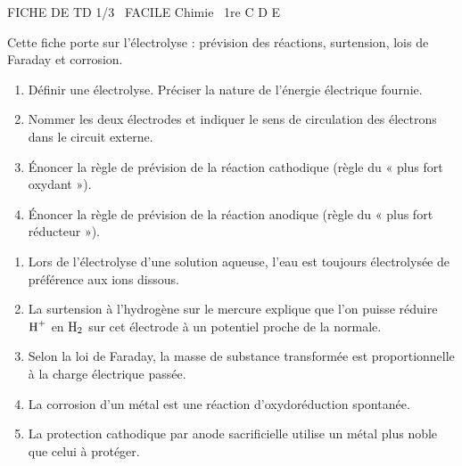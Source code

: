 \documentclass[11pt]{article}
\begin{document}
\begin{tcolorbox}[enhanced,colback=popink,colframe=popink,arc=10pt,boxrule=0pt,left=12pt,right=12pt,top=9pt,bottom=9pt]
{\color{white}\popxbold\small FICHE DE TD 1/3 \textbullet\ FACILE \hfill Chimie \textbullet\ 1re C D E\par}
\end{tcolorbox}
\vspace{4pt}
Cette fiche porte sur l'électrolyse : prévision des réactions, surtension, lois de Faraday et corrosion.

\begin{exercice}
\begin{enumerate}
    \item Définir une électrolyse. Préciser la nature de l'énergie électrique fournie.
    \item Nommer les deux électrodes et indiquer le sens de circulation des électrons dans le circuit externe.
    \item Énoncer la règle de prévision de la réaction cathodique (règle du « plus fort oxydant »).
    \item Énoncer la règle de prévision de la réaction anodique (règle du « plus fort réducteur »).
\end{enumerate}
\end{exercice}

\begin{exercice}
\begin{enumerate}
    \item Lors de l'électrolyse d'une solution aqueuse, l'eau est toujours électrolysée de préférence aux ions dissous.
    \item La surtension à l'hydrogène sur le mercure explique que l'on puisse réduire $\ce{H+}$ en $\ce{H2}$ sur cet électrode à un potentiel proche de la normale.
    \item Selon la loi de Faraday, la masse de substance transformée est proportionnelle à la charge électrique passée.
    \item La corrosion d'un métal est une réaction d'oxydoréduction spontanée.
    \item La protection cathodique par anode sacrificielle utilise un métal plus noble que celui à protéger.
\end{enumerate}
\end{exercice}
\end{document}
